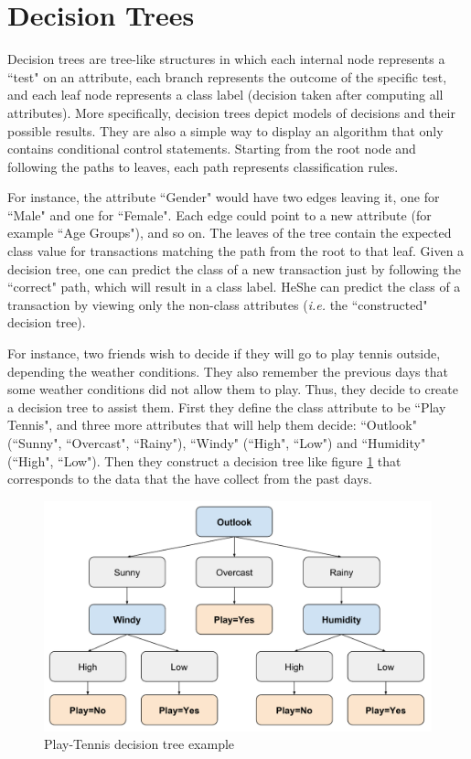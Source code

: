 \newpage
\section{Decision Trees}\label{s:decision-trees}

Decision trees are tree-like structures in which each internal node represents a ``test" on an attribute, each branch represents the outcome of the specific test, and each leaf node represents a class label (decision taken after computing all attributes).
More specifically, decision trees depict models of decisions and their possible results.
They are also a simple way to display an algorithm that only contains conditional control statements.
Starting from the root node and following the paths to leaves, each path represents classification rules.

For instance, the attribute ``Gender" would have two edges leaving it, one for ``Male" and
one for ``Female".
Each edge could point to a new attribute (for example ``Age Groups"), and so on.
The leaves of the tree contain the expected class value for transactions matching the path from the root to that leaf.
Given a decision tree, one can predict the class of a new transaction just by following the ``correct" path, which will result in a class label.
He\myslash She can predict the class of a transaction by viewing only the non-class attributes (\textit{i.e.} the ``constructed" decision tree).

For instance, two friends wish to decide if they will go to play tennis outside, depending the weather conditions.
They also remember the previous days that some weather conditions did not allow them to play.
Thus, they decide to create a decision tree to assist them.
First they define the class attribute to be ``Play Tennis", and three more attributes that will help them decide: ``Outlook" (``Sunny", ``Overcast", ``Rainy"), ``Windy" (``High", ``Low") and ``Humidity" (``High", ``Low").
Then they construct a decision tree like figure \ref{f:outlook} that corresponds to the data that the have collect from the past days.

\begin{figure}[th]
  \centering
  \includegraphics[width=0.8\linewidth]{figures/outlook.pdf}
  \caption{Play-Tennis decision tree example}\label{f:outlook}
\end{figure}

